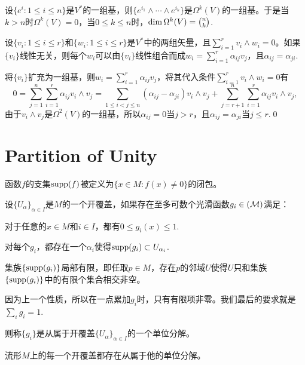 \para 设$\{e^i:1\leq i \leq n\}$是$V^*$的一组基，则$\{e^{i_1}\wedge \cdots \wedge e^{i_k}\}$是$\Omega^k(V)$的一组基。于是当$k>n$时$\Omega^k(V)=0$，当$0\leq k \leq n$时，$\dim \Omega^k(V)=\tbinom nk$.

\begin{lem}[Cartan引理]
设$\{v_i:1\leq i \leq r\}$和$\{w_i:1\leq i \leq r\}$是$V^*$中的两组矢量，且$\sum_{i=1}^rv_i\wedge w_i=0$。如果$\{v_i\}$线性无关，则每个$w_i$可以由$\{v_i\}$线性组合而成$w_i=\sum_{i=1}^r\alpha_{ij}v_j$，且$\alpha_{ij}=\alpha_{ji}$.
\end{lem}

\proof
	将$\{v_i\}$扩充为一组基，则$w_i=\sum_{i=1}^r\alpha_{ij}v_j$，将其代入条件$\sum_{i=1}^rv_i\wedge w_i=0$有
	\[
		0=\sum_{j=1}^n\sum_{i=1}^r \alpha_{ij}v_i \wedge v_j=\sum_{1\leq i < j \leq n}(\alpha_{ij}-\alpha_{ji}) v_i \wedge v_j+\sum_{j=r+1}^n\sum_{i=1}^r \alpha_{ij}v_i \wedge v_j,
	\]
	由于$v_i \wedge v_j$是$\Omega^2(V)$的一组基，所以$\alpha_{ij}=0$当$j>r$，且$\alpha_{ij}=\alpha_{ji}$当$j\leq r$.\qed


\chapter{Partition of Unity}

函数$f$的支集$\operatorname{supp}(f)$被定义为$\{x\in M:f(x)\neq 0\}$的闭包。

\begin{para}[单位分解]\label{POUdef}
设$\{U_\alpha\}_{\alpha\in I}$是$M$的一个开覆盖，如果存在至多可数个光滑函数$g_i\in \cal(M)$满足：

 对于任意的$x\in M$和$i\in I$，都有$0\leq g_i(x)\leq 1$.

 对每个$g_i$，都存在一个${\alpha_i}$使得$\operatorname{supp}(g_i)\subset U_{\alpha_i}$.

 集族$\{\operatorname{supp}(g_i)\}$局部有限，即任取$p\in M$，存在$p$的邻域$U$使得$U$只和集族$\{\operatorname{supp}(g_i)\}$中的有限个集合相交非空。

 因为上一个性质，所以在一点累加$g_i$时，只有有限项非零。我们最后的要求就是$\sum_i g_i=1$.

则称$\{g_i\}$是从属于开覆盖$\{U_\alpha\}_{\alpha\in I}$的一个单位分解。
\end{para}

\begin{lem}
\label{POU}流形$M$上的每一个开覆盖都存在从属于他的单位分解。
\end{lem}

